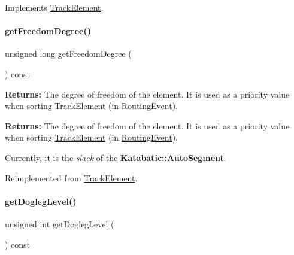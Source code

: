 Implements \mbox{\hyperlink{classKite_1_1TrackElement_ad96c66549598873bf68c2e18ec7164c1}{Track\+Element}}.

\mbox{\label{classKite_1_1TrackSegment_aa7552c20cc46abcac558627b2ca341f8}} 
\paragraph{\texorpdfstring{get\+Freedom\+Degree()}{getFreedomDegree()}}
{\footnotesize\ttfamily unsigned long get\+Freedom\+Degree (\begin{DoxyParamCaption}{ }\end{DoxyParamCaption}) const\hspace{0.3cm}{\ttfamily [virtual]}}

{\bfseries Returns\+:} The degree of freedom of the element. It is used as a priority value when sorting \mbox{\hyperlink{classKite_1_1TrackElement}{Track\+Element}} (in \mbox{\hyperlink{classKite_1_1RoutingEvent}{Routing\+Event}}).

{\bfseries Returns\+:} The degree of freedom of the element. It is used as a priority value when sorting \mbox{\hyperlink{classKite_1_1TrackElement}{Track\+Element}} (in \mbox{\hyperlink{classKite_1_1RoutingEvent}{Routing\+Event}}).

Currently, it is the {\itshape slack} of the \textbf{ Katabatic\+::\+Auto\+Segment}. 

Reimplemented from \mbox{\hyperlink{classKite_1_1TrackElement_aa7552c20cc46abcac558627b2ca341f8}{Track\+Element}}.

\mbox{\label{classKite_1_1TrackSegment_add78c6f914788c549f144998caacda84}} 
\paragraph{\texorpdfstring{get\+Dogleg\+Level()}{getDoglegLevel()}}
{\footnotesize\ttfamily unsigned int get\+Dogleg\+Level (\begin{DoxyParamCaption}{ }\end{DoxyParamCaption}) const\hspace{0.3cm}{\ttfamily [virtual]}}

